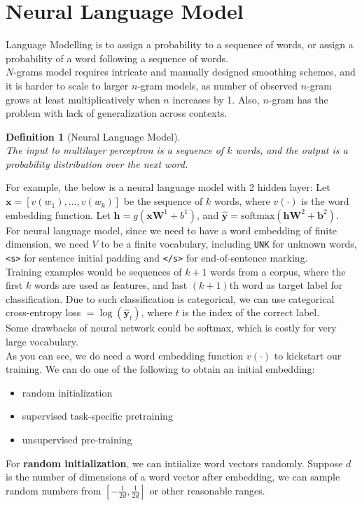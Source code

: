 \documentclass[12pt]{article}
\newtheorem{definition}{Definition}[section]
\theoremstyle{definition}
\newcommand{\x}{\mathbf{x}}
\newcommand{\y}{\mathbf{y}}
\begin{document}
\section{Neural Language Model}
Language Modelling is to assign a probability to a sequence of words, or assign a probability of a word following a sequence of words.\\
$N$-grams model requires intricate and manually designed smoothing schemes, and it is harder to scale to larger $n$-gram models, as number of observed $n$-gram grows at least multiplicatively when $n$ increases by 1. Also, $n$-gram has the problem with lack of generalization across contexts.
\begin{definition}[Neural Language Model]
\hfill\\\normalfont The input to multilayer perceptron is a sequence of $k$ words, and the output is a probability distribution over the next word.
\end{definition}
For example, the below is a neural language model with 2 hidden layer:
Let $\x=[v(w_1),\ldots, v(w_k)]$ be the sequence of $k$ words, where $v(\cdot)$ is the word embedding function. Let $\mathbf{h}=g(\x\mathbf{W}^1 + b^1)$, and $\hat{\y}=\text{softmax}(\mathbf{hW}^2 + \mathbf{b}^2)$.\\
For neural language model, since we need to have a word embedding of finite dimension, we need $V$ to be a finite vocabulary, including \texttt{UNK} for unknown words, \texttt{<s>} for sentence initial padding and \texttt{</s>} for end-of-sentence marking.\\

Training examples would be sequences of $k+1$ words from a corpus, where the first $k$ words are used as features, and last $(k+1)$th word as target label for classification. Due to such classification is categorical, we can use categorical cross-entropy loss $=\log(\hat{\y}_t)$, where $t$ is the index of the correct label.\\

Some drawbacks of neural network could be softmax, which is costly for very large vocabulary.\\

As you can see, we do need a word embedding function $v(\cdot)$ to kickstart our training. We can do one of the following to obtain an initial embedding:
\begin{itemize}
	\item random initialization
	\item supervised task-specific pretraining
	\item unsupervised pre-training
\end{itemize}
For \textbf{random initialization}, we can intiialize word vectors randomly. Suppose $d$ is the number of dimensions of a word vector after embedding, we can sample random numbers from $[-\frac{1}{2d}, \frac{1}{2d}]$ or other reasonable ranges.\\
\end{document}
